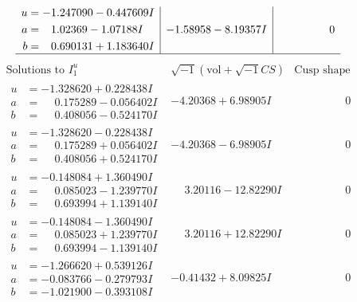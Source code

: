\documentclass[1p]{elsarticle_modified}
\theoremstyle{definition}
\newcommand{\I}{\sqrt{-1}}
\begin{document}
$$\begin{array}{c|c|c}
\begin{aligned}
u &= -1.247090 - 0.447609 I \\
a &= \phantom{-}1.02369 - 1.07188 I \\
b &= \phantom{-}0.690131 + 1.183640 I\end{aligned}
 & -1.58958 - 8.19357 I & \phantom{-0.000000 } 0\\
 \hline 
 \end{array}$$\newpage$$\begin{array}{c|c|c}  
\text{Solutions to }I^u_{1}& \I (\text{vol} + \sqrt{-1}CS) & \text{Cusp shape}\\
 \hline 
\begin{aligned}
u &= -1.328620 + 0.228438 I \\
a &= \phantom{-}0.175289 - 0.056402 I \\
b &= \phantom{-}0.408056 - 0.524170 I\end{aligned}
 & -4.20368 + 6.98905 I & \phantom{-0.000000 } 0 \\ \hline\begin{aligned}
u &= -1.328620 - 0.228438 I \\
a &= \phantom{-}0.175289 + 0.056402 I \\
b &= \phantom{-}0.408056 + 0.524170 I\end{aligned}
 & -4.20368 - 6.98905 I & \phantom{-0.000000 } 0 \\ \hline\begin{aligned}
u &= -0.148084 + 1.360490 I \\
a &= \phantom{-}0.085023 - 1.239770 I \\
b &= \phantom{-}0.693994 + 1.139140 I\end{aligned}
 & \phantom{-}3.20116 - 12.82290 I & \phantom{-0.000000 } 0 \\ \hline\begin{aligned}
u &= -0.148084 - 1.360490 I \\
a &= \phantom{-}0.085023 + 1.239770 I \\
b &= \phantom{-}0.693994 - 1.139140 I\end{aligned}
 & \phantom{-}3.20116 + 12.82290 I & \phantom{-0.000000 } 0 \\ \hline\begin{aligned}
u &= -1.266620 + 0.539126 I \\
a &= -0.083766 - 0.279793 I \\
b &= -1.021900 - 0.393108 I\end{aligned}
 & -0.41432 + 8.09825 I & \phantom{-0.000000 } 0 \\ \hline\begin{aligned}

\end{aligned}
\end{array}$$
\end{document}
